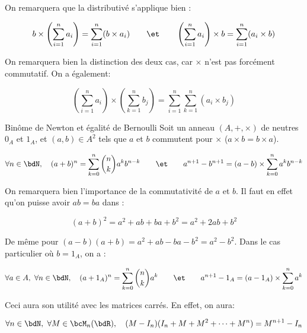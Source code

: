 \documentclass[a4paper,french,bookmarks]{article}
\begin{document}
On remarquera que la distributivé s'applique bien :

\[ b \times \left(\sum_{i=1}^n a_i\right) = \sum_{i=1}^n (b\times a_i) \qquad\et\qquad \left(\sum_{i=1}^n a_i\right) \times b = \sum_{i=1}^n (a_i \times b)\]

On remarquera bien la distinction des deux cas, car $\times$ n'est pas forcément commutatif. On a également:

\[ \left(\sum_{i=1}^n a_i\right) \times \left(\sum_{k=1}^n b_j\right) = \sum_{i=1}^n \sum_{k=1}^n (a_i \times b_j)\]

\begin{property}{Binôme de Newton et égalité de Bernoulli}{}
    Soit un anneau $(A, +, \times)$ de neutres $0_A$ et $1_A$, et $(a, b) \in A^2$ tels que $a$ et $b$ commutent pour $\times$ ($a \times b = b \times a$).
    
    \[ \forall n \in \bdN, \quad (a+b)^n = \sum_{k=0}^n \binom{n}{k}a^k b^{n-k} \qquad\et\qquad a^{n+1}-b^{n+1} = (a-b) \times \sum_{k=0}^n a^k b^{n-k}\]
\end{property}


On remarquera bien l'importance de la commutativité de $a$ et $b$. Il faut en effet qu'on puisse avoir $ab = ba$ dans :

\[(a+b)^2 = a^2 + ab + ba + b^2 = a^2 + 2ab + b^2\] 

De même pour $(a-b)(a+b) = a^2 + ab - ba - b^2 = a^2 - b^2$. Dans le cas particulier où $b = 1_A$, on a :

\[ \forall a \in A,\ \forall n \in \bdN,\quad (a+ 1_A)^n = \sum_{k=0}^n \binom{n}{k}a^k \qquad\et\qquad a^{n+1} - 1_A = (a - 1_A)\times\sum_{k=0}^n a^k\]

Ceci aura son utilité avec les matrices carrés. En effet, on aura:

\[ \forall n \in \bdN,\ \forall M \in \bcM_n(\bdR), \quad (M-I_n)(I_n + M + M^2 + \dots + M^n) = M^{n+1}-I_n  \]
\end{document}
